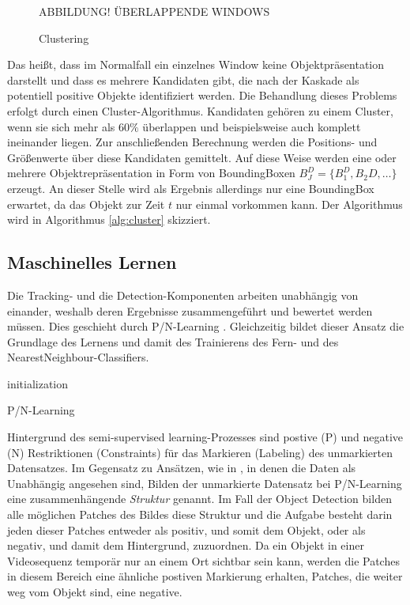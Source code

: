 	\begin{figure}
		\begin{centering}
			ABBILDUNG! ÜBERLAPPENDE WINDOWS
			\caption{Clustering}
			\label{abb:cluster}
			\par
		\end{centering}
	\end{figure}

	Das heißt, dass im Normalfall ein einzelnes Window keine Objektpräsentation darstellt und dass es mehrere Kandidaten gibt, die nach der Kaskade als potentiell positive Objekte identifiziert werden. Die Behandlung dieses Problems erfolgt durch einen Cluster-Algorithmus. Kandidaten gehören zu einem Cluster, wenn sie sich mehr als $60\%$ überlappen und beispielsweise auch komplett ineinander liegen. Zur anschließenden Berechnung werden die Positions- und Größenwerte über diese Kandidaten gemittelt. Auf diese Weise werden eine oder mehrere Objektrepräsentation in Form von BoundingBoxen $B_J^D = \{B_1^D, B_2D, \dots\}$ erzeugt. An dieser Stelle wird als Ergebnis allerdings nur eine BoundingBox erwartet, da das Objekt zur Zeit $t$ nur einmal vorkommen kann. Der Algorithmus wird in Algorithmus \ref{alg:cluster} skizziert.

	\subsection{Maschinelles Lernen}
	\label{subsection:machine_learning}
	Die Tracking- und die Detection-Komponenten arbeiten unabhängig von einander, weshalb deren Ergebnisse zusammengeführt und bewertet werden müssen. Dies geschieht durch P/N-Learning \cite{PNL}. Gleichzeitig bildet dieser Ansatz die Grundlage des Lernens und damit des Trainierens
	des Fern- und des NearestNeighbour-Classifiers.

	\begin{algorithm}
	\vspace{0.2cm}
	initialization\;
	\caption{P/N-Learning}
	\label{alg:learning}
	\vspace{0.2cm}
	\end{algorithm}

	Hintergrund des semi-supervised learning-Prozesses sind postive (P)	und negative (N) Restriktionen (Constraints) für das Markieren (Labeling)	des unmarkierten Datensatzes. Im Gegensatz zu Ansätzen, wie in \cite{TCL} \cite{CLU}, in denen die Daten als Unabhängig angesehen sind, Bilden der unmarkierte Datensatz bei P/N-Learning eine zusammenhängende \textit{Struktur} genannt. Im Fall der Object Detection bilden alle möglichen Patches des Bildes diese Struktur und die Aufgabe besteht darin jeden dieser Patches entweder als positiv, und somit dem Objekt, oder als negativ, und damit dem Hintergrund, zuzuordnen. Da ein Objekt in einer Videosequenz temporär nur an einem Ort sichtbar sein kann, werden die Patches in diesem Bereich eine ähnliche postiven Markierung erhalten, Patches, die weiter weg vom Objekt sind, eine negative.

